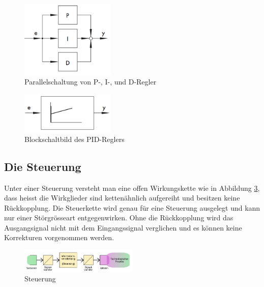 \begin{figure}[h!, width=\pagewidth]
\begin{center}
\includegraphics[width=0.4\textwidth]{images/PRDRegler1}
\caption{Parallelschaltung von P-, I-, und D-Regler}
\label{fig:PRDRegler1}
\end{center}
\end{figure}

\begin{figure}[h!, width=\pagewidth]
\begin{center}
\includegraphics[width=0.4\textwidth]{images/PIDRegler2}
\caption{Blockschaltbild des PID-Reglers}
\label{fig:PIDRegler2}
\end{center}
\end{figure}


\subsection{Die Steuerung}

Unter einer Steuerung versteht man eine offen Wirkungskette wie in Abbildung \ref{fig:Steuerung}, dass heisst die Wirkglieder sind kettenähnlich aufgereiht und besitzen keine Rückkopplung. Die Steuerkette wird genau für eine Steuerung ausgelegt und kann nur einer Störgrösseart entgegenwirken. Ohne die Rückkopplung wird das Ausgangsignal nicht mit dem Eingangssignal verglichen und es können keine Korrekturen vorgenommen werden.

\begin{figure}[!h!, width=\pagewidth]
\begin{center}
\includegraphics[width=0.5\textwidth]{images/Steuerung}
\caption{Steuerung}
\label{fig:Steuerung}
\end{center}
\end{figure}

